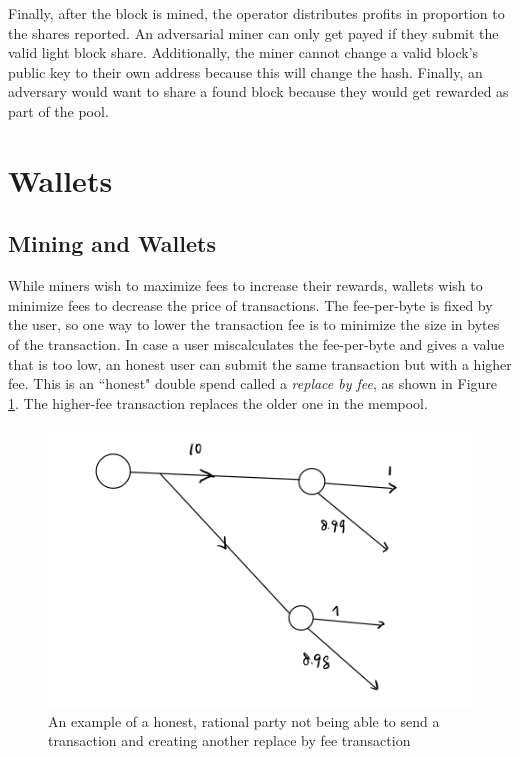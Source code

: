 Finally, after the block is mined, the operator distributes profits in proportion to the shares reported. An adversarial miner can only get payed if they submit the valid light block share. Additionally, the miner cannot change a valid block's public key to their own address because this will change the hash. Finally, an adversary would want to share a found block because they would get rewarded as part of the pool.

\section{Wallets}

\subsection{Mining and Wallets}
While miners wish to maximize fees to increase their rewards, wallets wish to minimize fees to decrease the price of transactions. The fee-per-byte is fixed by the user, so one way to lower the transaction fee is to minimize the size in bytes of the transaction. In case a user miscalculates the fee-per-byte and gives a value that is too low, an honest user can submit the same transaction but with a higher fee. This is an ``honest" double spend called a \textit{replace by fee}, as shown in Figure \ref{fig:replace_by_fee}. The higher-fee transaction replaces the older one in the mempool.

\begin{figure}[ht]
    \centering
    \includegraphics[scale = 0.5]{figures/replace_by_fee.png}
    \caption{An example of a honest, rational party not being able to send a transaction and creating another replace by fee transaction}
    \label{fig:replace_by_fee}
\end{figure}


